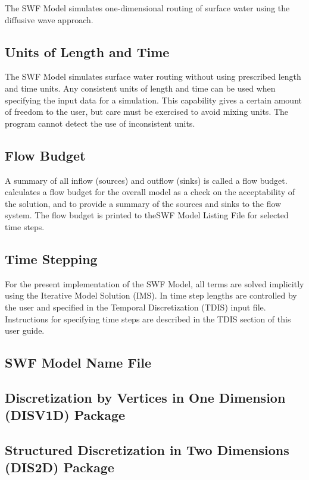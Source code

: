 The SWF Model simulates one-dimensional routing of surface water using the diffusive wave approach.

\subsection{Units of Length and Time}
The SWF Model simulates surface water routing without using prescribed length and time units. Any consistent units of length and time can be used when specifying the input data for a simulation. This capability gives a certain amount of freedom to the user, but care must be exercised to avoid mixing units.  The program cannot detect the use of inconsistent units.

\subsection{Flow Budget}
A summary of all inflow (sources) and outflow (sinks) is called a flow budget.  \mf calculates a flow budget for the overall model as a check on the acceptability of the solution, and to provide a summary of the sources and sinks to the flow system.  The flow budget is printed to theSWF Model Listing File for selected time steps.

\subsection{Time Stepping}

For the present implementation of the SWF Model, all terms are solved implicitly using the Iterative Model Solution (IMS).  In \mf time step lengths are controlled by the user and specified in the Temporal Discretization (TDIS) input file.  Instructions for specifying time steps are described in the TDIS section of this user guide.  

\newpage
\subsection{SWF Model Name File}


\newpage
\subsection{Discretization by Vertices in One Dimension (DISV1D) Package}


\newpage
\subsection{Structured Discretization in Two Dimensions (DIS2D) Package}



